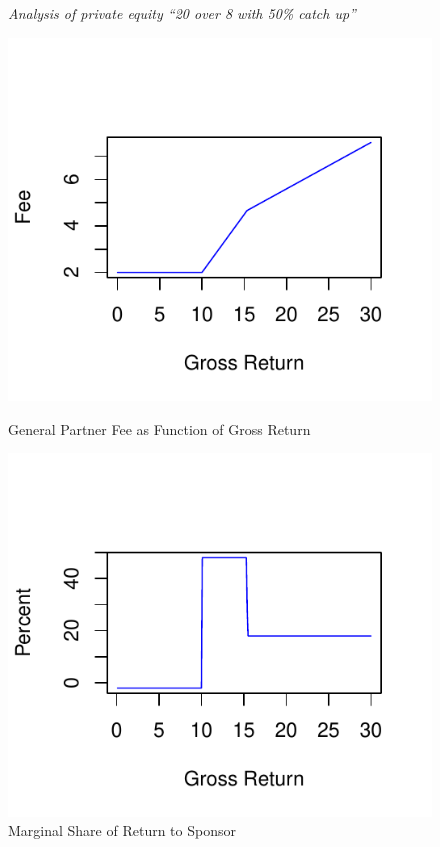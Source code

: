 \documentclass[12pt,english]{article}\usepackage[]{graphicx}\usepackage[]{color}
\makeatletter
\def\maxwidth{ %
  \ifdim\Gin@nat@width>\linewidth
    \linewidth
  \else
    \Gin@nat@width
  \fi
}
\newenvironment{knitrout}{}{} %
\makeatother
\begin{document}
\begin{figure}[h]
\emph{Analysis of private equity ``20 over 8 with 50\% catch up''} 

\begin{minipage}[t]{0.45\columnwidth}%
\begin{knitrout}
\color{fgcolor}
\includegraphics[width=\maxwidth]{figure/pe6-1} 

\end{knitrout}
\caption{General Partner Fee as Function of Gross Return}
%
\end{minipage}\hfill{}%
\begin{minipage}[t]{0.45\columnwidth}%
\begin{knitrout}
\color{fgcolor}
\includegraphics[width=\maxwidth]{figure/pe7-1} 

\end{knitrout}

\caption{Marginal Share of Return to Sponsor}
%
\end{minipage}
\end{figure}
\end{document}

